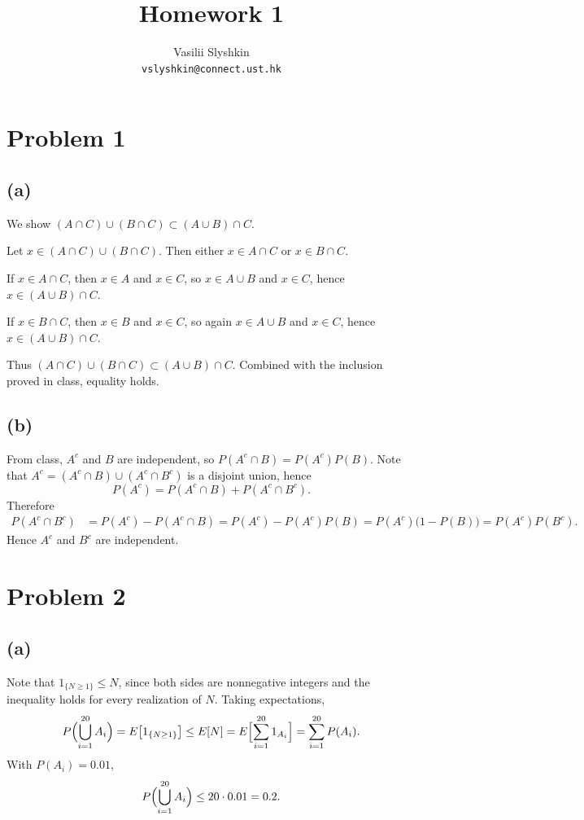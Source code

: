 \documentclass[11pt]{article}
\title{\textbf{Homework 1}}
\author{Vasilii Slyshkin \\ \texttt{vslyshkin@connect.ust.hk}}
\date{}
\begin{document}
\maketitle

\section*{Problem 1}

\subsection*{(a)}

We show $(A\cap C)\cup(B\cap C)\subset(A\cup B)\cap C$.

Let $x\in(A\cap C)\cup(B\cap C)$. Then either $x\in A\cap C$ or $x\in B\cap C$.

If $x\in A\cap C$, then $x\in A$ and $x\in C$, so $x\in A\cup B$ and $x\in C$, hence $x\in(A\cup B)\cap C$.

If $x\in B\cap C$, then $x\in B$ and $x\in C$, so again $x\in A\cup B$ and $x\in C$, hence $x\in(A\cup B)\cap C$.

Thus $(A\cap C)\cup(B\cap C)\subset(A\cup B)\cap C$. Combined with the inclusion proved in class, equality holds.

\subsection*{(b)}

From class, $A^c$ and $B$ are independent, so $P(A^c\cap B)=P(A^c)P(B)$. Note that $A^c= (A^c\cap B)\cup(A^c\cap B^c)$ is a disjoint union, hence
\[
P(A^c)=P(A^c\cap B)+P(A^c\cap B^c).
\]
Therefore
\begin{align*}
P(A^c\cap B^c)
&= P(A^c)-P(A^c\cap B)
= P(A^c)-P(A^c)P(B)
= P(A^c)\bigl(1-P(B)\bigr)
= P(A^c)P(B^c).
\end{align*}
Hence $A^c$ and $B^c$ are independent.

\section*{Problem 2}

\subsection*{(a)}

Note that $1_{\{N\ge 1\}}\le N$, since both sides are nonnegative integers and the inequality holds for every realization of $N$. Taking expectations,
\[
P\Bigl(\bigcup_{i=1}^{20} A_i\Bigr)
= E\bigl[1_{\{N\ge 1\}}\bigr]
\le E[N]
= E\Bigl[\sum_{i=1}^{20} 1_{A_i}\Bigr]
= \sum_{i=1}^{20} P(A_i).
\]
With $P(A_i)=0.01$,
\[
P\Bigl(\bigcup_{i=1}^{20} A_i\Bigr)\le 20\cdot 0.01 = 0.2.
\]
\end{document}
